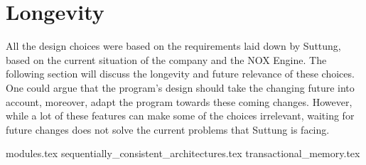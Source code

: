 \section{Longevity}
All the design choices were based on the requirements laid down by Suttung,
based on the current situation of the company and the NOX Engine.
The following section will discuss the longevity and future relevance of
these choices.
One could argue that the program's design should take the changing future into account, moreover, adapt the program towards these coming changes.
However, while a lot of these features can make some of the choices
irrelevant, waiting for future changes does not solve the current problems that
Suttung is facing.

{modules.tex}
{sequentially_consistent_architectures.tex}
{transactional_memory.tex}
